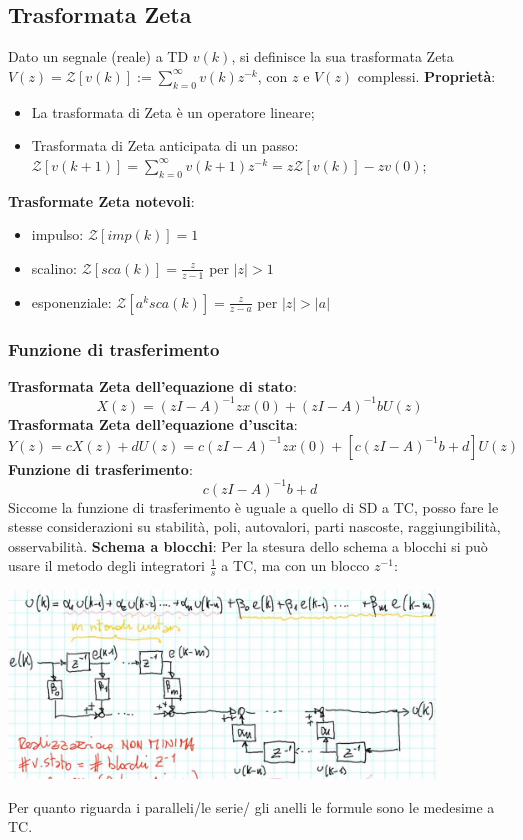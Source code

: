 \begin{landscape}
\begin{multicols*}{2}
    \subsection{Trasformata Zeta}
    Dato un segnale (reale) a TD $v(k)$, si definisce la sua trasformata Zeta $V(z) = \mathcal{Z}[v(k)] := \sum_{k=0}^{\infty} v(k) z^{-k}$, con $z$ e $V(z)$ complessi.\newline
    \textbf{Proprietà}:
    \begin{itemize}
        \item La trasformata di Zeta è un operatore lineare;
        \item Trasformata di Zeta anticipata di un passo: $\mathcal{Z}[v(k+1)] = \sum_{k=0}^{\infty} v(k+1) z^{-k} = z \mathcal{Z}[v(k)] - z v(0)$;
    \end{itemize}
    \textbf{Trasformate Zeta notevoli}:
    \begin{itemize}
        \item impulso: $\mathcal{Z}[imp(k)] = 1$
        \item scalino: $\mathcal{Z}[sca(k)] = \frac{z}{z-1}$ per $|z|>1$
        \item esponenziale: $\mathcal{Z}[a^k sca(k)] = \frac{z}{z-a}$ per $|z| > |a|$
    \end{itemize}
    \subsubsection{Funzione di trasferimento}
    \textbf{Trasformata Zeta dell'equazione di stato}:
    \[
        X(z) = (zI-A)^{-1} z x(0) + (zI-A)^{-1} b U(z)
    \]
    \textbf{Trasformata Zeta dell'equazione d'uscita}:
    \[
        Y(z) = cX(z) + dU(z) = c(zI-A)^{-1} z x(0) + [c(zI-A)^{-1} b + d] U(z)
    \]
    \textbf{Funzione di trasferimento}:
    \[
        c(zI-A)^{-1} b + d
    \]
    Siccome la funzione di trasferimento è uguale a quello di SD a TC, posso fare le stesse considerazioni su stabilità, poli, autovalori, parti nascoste, raggiungibilità, osservabilità.\newline
    \newline
    \textbf{Schema a blocchi}:\newline
    Per la stesura dello schema a blocchi si può usare il metodo degli integratori $\frac{1}{s}$ a TC, ma con un blocco $z^{-1}$:
    \begin{center}
        \includegraphics[height=5cm]{../formulario/img14.JPG}
    \end{center} 
    Per quanto riguarda i paralleli/le serie/ gli anelli le formule sono le medesime a TC. 

\end{multicols*}
\end{landscape}
